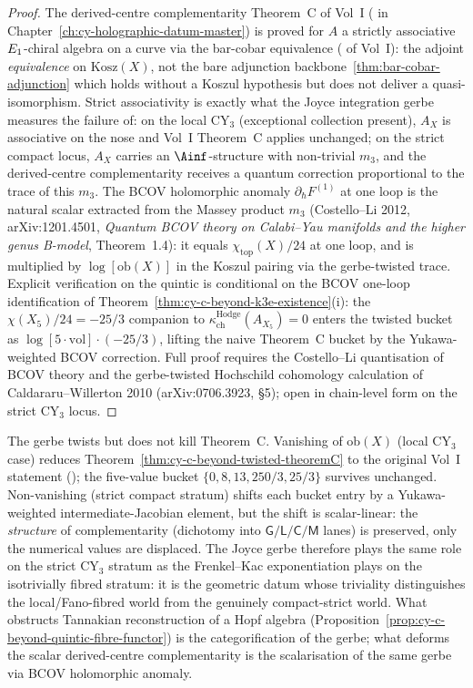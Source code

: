 \begin{proof}
The derived-centre complementarity Theorem~C of Vol~I
(\cite{VolI} in
Chapter~\ref{ch:cy-holographic-datum-master}) is proved for $A$ a strictly associative
$E_{1}$-chiral algebra on a curve via the bar-cobar equivalence
(\cite{VolI} of Vol~I): the adjoint
\emph{equivalence} on $\mathrm{Kosz}(X)$, not the bare adjunction
backbone~\ref{thm:bar-cobar-adjunction} which holds without a Koszul
hypothesis but does not deliver a quasi-isomorphism. Strict associativity
is exactly what the Joyce integration gerbe measures the failure of: on the
local CY$_3$ (exceptional collection present), $A_X$ is associative on the
nose and Vol~I Theorem~C applies unchanged; on the strict compact locus,
$A_X$ carries an $\Ainf$-structure with non-trivial $m_3$, and the
derived-centre complementarity receives a quantum correction proportional to
the trace of this $m_3$. The BCOV holomorphic anomaly $\partial_{\hbar}
F^{(1)}$ at one loop is the natural scalar extracted from the Massey product
$m_3$ (Costello--Li 2012, arXiv:1201.4501, \emph{Quantum BCOV theory on
Calabi--Yau manifolds and the higher genus B-model}, Theorem~1.4): it equals
$\chi_{\mathrm{top}}(X)/24$ at one loop, and is multiplied by
$\log[\mathrm{ob}(X)]$ in the Koszul pairing via the gerbe-twisted trace.
Explicit verification on the quintic is conditional on the BCOV one-loop
identification of
Theorem~\ref{thm:cy-c-beyond-k3e-existence}(i): the $\chi(X_5)/24 = -25/3$
companion to $\kappa_{\mathrm{ch}}^{\mathrm{Hodge}}(A_{X_5}) = 0$ enters the
twisted bucket as $\log[5 \cdot \mathrm{vol}] \cdot (-25/3)$, lifting the
naive Theorem~C bucket by the Yukawa-weighted BCOV correction. Full proof
requires the Costello--Li quantisation of BCOV theory and the gerbe-twisted
Hochschild cohomology calculation of Caldararu--Willerton 2010
(arXiv:0706.3923, \S 5); open in chain-level form on the strict CY$_3$ locus.
\end{proof}

\begin{remark}
\label{rem:cy-c-beyond-twist-not-kill}
The gerbe twists but does not kill Theorem~C. Vanishing of
$\mathrm{ob}(X)$ (local CY$_3$ case) reduces Theorem~\ref{thm:cy-c-beyond-twisted-theoremC}
to the original Vol~I statement
(\cite{VolI}); the five-value bucket
$\{0, 8, 13, 250/3, 25/3\}$ survives unchanged. Non-vanishing
(strict compact stratum) shifts each bucket entry by a Yukawa-weighted
intermediate-Jacobian element, but the shift is scalar-linear: the
\emph{structure} of complementarity (dichotomy into $\mathsf{G/L/C/M}$
lanes) is preserved, only the numerical values are displaced. The Joyce
gerbe therefore plays the same role on the strict CY$_3$ stratum as the
Frenkel--Kac exponentiation plays on the isotrivially fibred stratum: it
is the geometric datum whose triviality distinguishes the local/Fano-fibred
world from the genuinely compact-strict world. What obstructs Tannakian
reconstruction of a Hopf algebra
(Proposition~\ref{prop:cy-c-beyond-quintic-fibre-functor}) is the
categorification of the gerbe; what deforms the scalar derived-centre
complementarity is the scalarisation of the same gerbe via BCOV
holomorphic anomaly.
\end{remark}

